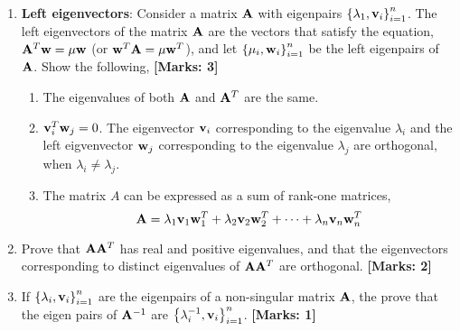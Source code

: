 \documentclass[12pt]{article}
\def\mf{\ensuremath\mathbf}
\def\lc{\ensuremath\left\{}
\def\rc{\ensuremath\right\}}
\begin{document}
\begin{enumerate}
     \item \textbf{Left eigenvectors}: Consider a matrix $\mf{A}$ with eigenpairs $\lc \lambda_1, \mf{v}_i\rc_{i=1}^n$. The left eigenvectors of the matrix $\mf{A}$ are the vectors that satisfy the equation, $\mf{A}^T\mf{w} = \mu \mf{w}$ (or $\mf{w}^T\mf{A} = \mu \mf{w}^T$), and let $\lc \mu_i, \mf{w}_i\rc_{i=1}^n$ be the left eigenpairs of $\mf{A}$. Show the following, \textbf{[Marks: 3]}
     \begin{enumerate}
         \item The eigenvalues of both $\mf{A}$ and $\mf{A}^T$ are the same.
         \item $\mf{v}_i^T\mf{w}_j = 0$. The eigenvector $\mf{v}_i$ corresponding to the eigenvalue $\lambda_i$ and the left eigvenvector $\mf{w}_j$ corresponding to the eigenvalue $\lambda_j$ are orthogonal, when $\lambda_i \neq \lambda_j$.
         \item The matrix $A$ can be expressed as a sum of rank-one matrices,
         \[ \mf{A} = \lambda_1\mf{v}_1\mf{w}_1^T + \lambda_2\mf{v}_2\mf{w}_2^T + \cdots + \lambda_n\mf{v}_n\mf{w}_n^T\]
     \end{enumerate}

     \item Prove that $\mf{A}\mf{A}^T$ has real and positive eigenvalues, and that the eigenvectors corresponding to distinct eigenvalues of $\mf{A}\mf{A}^T$ are orthogonal. \textbf{[Marks: 2]}

     \item If $\lc \lambda_i, \mf{v}_i\rc_{i=1}^n$ are the eigenpairs of a non-singular matrix $\mf{A}$, the prove that the eigen pairs of $\mf{A}^{-1}$ are $\lc \lambda_i^{-1}, \mf{v}_i\rc_{i=1}^n$. \textbf{[Marks: 1]}
\end{enumerate}
\end{document}
